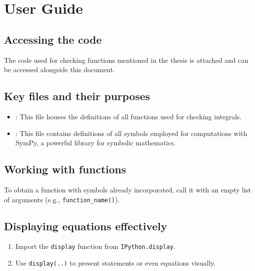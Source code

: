 \section{User Guide}\label{sec:user-guide}

\subsection{Accessing the code}\label{subsec:accessing-the-code}

The code used for checking functions mentioned in the thesis is attached
and can be accessed alongside this document.

\subsection{Key files and their purposes}\label{subsec:key-files-and-their-purposes}

\begin{itemize}
    \item {}:
    This file houses the definitions of all functions used for checking integrals.
    \item {}:
    This file contains definitions of all symbols employed for computations with SymPy,
    a powerful library for symbolic mathematics.
\end{itemize}

\subsection{Working with functions}\label{subsec:working-with-functions}

To obtain a function with symbols already incorporated,
call it with an empty list of arguments (e.g., \texttt{function_name()}).

\subsection{Displaying equations effectively}\label{subsec:displaying-equations-effectively}

\begin{enumerate}
    \item Import the \texttt{display} function from \texttt{IPython.display}.
    \item Use \texttt{display(..)} to present statements or even equations visually.
\end{enumerate}

